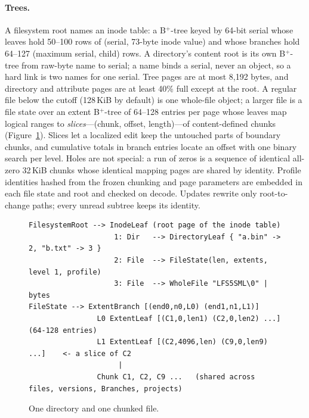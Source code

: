 \paragraph{Trees.} A filesystem root names an inode table: a B$^+$-tree keyed by 64-bit
serial whose leaves hold 50--100 rows of (serial, 73-byte inode value) and whose
branches hold 64--127 (maximum serial, child) rows. A directory's content root is its own
B$^+$-tree from raw-byte name to serial; a name binds a serial, never an object, so a
hard link is two names for one serial. Tree pages are at most 8,192 bytes, and directory
and attribute pages are at least 40\% full except at the root. A regular file below the
cutoff (128\,KiB by default) is one whole-file object; a larger file is a file state over
an extent B$^+$-tree of 64--128 entries per page whose leaves map logical ranges to
\emph{slices}---(chunk, offset, length)---of content-defined chunks
(Figure~\ref{fig:tree}). Slices let a localized edit keep the untouched parts of boundary
chunks, and cumulative totals in branch entries locate an offset with one binary search
per level. Holes are not special: a run of zeros is a sequence of identical all-zero
32\,KiB chunks whose identical mapping pages are shared by identity. Profile identities
hashed from the frozen chunking and page parameters are embedded in each file state and
root and checked on decode. Updates rewrite only root-to-change paths; every unread
subtree keeps its identity.

\begin{figure}[h]
\centering
\small
\begin{verbatim}
FilesystemRoot --> InodeLeaf (root page of the inode table)
                    1: Dir   --> DirectoryLeaf { "a.bin" -> 2, "b.txt" -> 3 }
                    2: File  --> FileState(len, extents, level 1, profile)
                    3: File  --> WholeFile "LFS5SML\0" | bytes
FileState --> ExtentBranch [(end0,n0,L0) (end1,n1,L1)]
                L0 ExtentLeaf [(C1,0,len1) (C2,0,len2) ...]      (64-128 entries)
                L1 ExtentLeaf [(C2,4096,len) (C9,0,len9) ...]    <- a slice of C2
                     |
                Chunk C1, C2, C9 ...   (shared across files, versions, Branches, projects)
\end{verbatim}
\caption{One directory and one chunked file.}
\label{fig:tree}
\end{figure}

